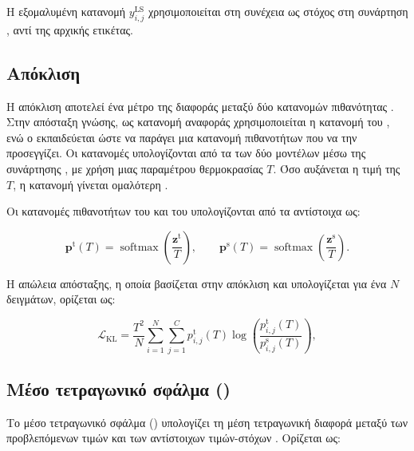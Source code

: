 Η εξομαλυμένη κατανομή \(y_{i,j}^{\mathrm{LS}}\) χρησιμοποιείται στη
συνέχεια ως στόχος στη συνάρτηση , αντί της αρχικής
ετικέτας.


\subsection{Απόκλιση }
\label{subsec:kl-divergence}

Η απόκλιση  αποτελεί ένα μέτρο της διαφοράς
μεταξύ δύο κατανομών πιθανότητας \cite{goodfellow2016deep}.
Στην απόσταξη γνώσης, ως κατανομή αναφοράς χρησιμοποιείται η κατανομή του
, ενώ ο  εκπαιδεύεται ώστε να παράγει μια κατανομή
πιθανοτήτων που να την προσεγγίζει. Οι κατανομές υπολογίζονται από τα
 των δύο μοντέλων μέσω της συνάρτησης , με χρήση
μιας παραμέτρου θερμοκρασίας \(T\). Όσο αυξάνεται η τιμή της \(T\), η
κατανομή γίνεται ομαλότερη \cite{beyer2022knowledge}.
 
Οι κατανομές πιθανοτήτων του  και του 
υπολογίζονται από τα αντίστοιχα  ως:

\begin{equation}
    \mathbf{p}^{\mathrm{t}}(T)
    =
    \operatorname{softmax}
    \left(\frac{\mathbf{z}^{\mathrm{t}}}{T}\right),
    \qquad
    \mathbf{p}^{\mathrm{s}}(T)
    =
    \operatorname{softmax}
    \left(\frac{\mathbf{z}^{\mathrm{s}}}{T}\right).
\end{equation}

Η απώλεια απόσταξης, η οποία βασίζεται στην απόκλιση  και
υπολογίζεται για ένα  \(N\) δειγμάτων, ορίζεται ως:


\begin{equation}
    \mathcal{L}_{\mathrm{KL}}
    =
    \frac{T^2}{N}
    \sum_{i=1}^{N}
    \sum_{j=1}^{C}
    p_{i,j}^{\mathrm{t}}(T)
    \log\left(
        \frac{p_{i,j}^{\mathrm{t}}(T)}
             {p_{i,j}^{\mathrm{s}}(T)}
    \right),
    \label{eq:kl-distillation}
\end{equation}



\subsection{Μέσο τετραγωνικό σφάλμα
()}
\label{subsec:mse-loss}

Το μέσο τετραγωνικό σφάλμα () υπολογίζει τη μέση τετραγωνική
διαφορά μεταξύ των προβλεπόμενων τιμών και των αντίστοιχων τιμών-στόχων
\cite{goodfellow2016deep}. Ορίζεται ως:

